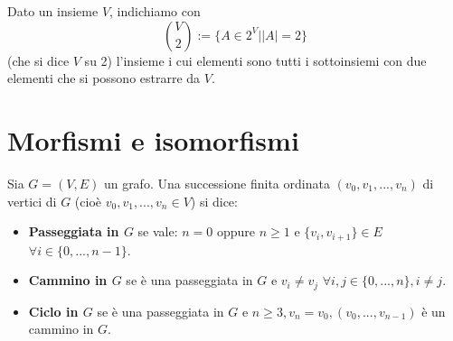 \documentclass[oneside]{book}
\begin{document}
\begin{tcolorbox}[colback=yellow!30, colframe=yellow!30!black, title=Insieme dei 2-sottoinsiemi]
Dato un insieme $V$, indichiamo con
\[ \binom{V}{2}:=\{ A \in 2^V| \left|A\right|=2 \} \]
(che si dice $V$ su 2) l'insieme i cui elementi sono tutti
i sottoinsiemi con due elementi che si possono estrarre da $V$.
\end{tcolorbox}



\section{Morfismi e isomorfismi}



\begin{tcolorbox}[colback=yellow!30, colframe=yellow!30!black, title={Passeggiate, cammini, cicli}]
Sia $G=(V,E)$ un grafo. Una successione finita ordinata $(v_0,v_1,...,v_n)$
di vertici di $G$ (cioè $v_0,v_1,...,v_n \in V$) si dice:
\begin{itemize}
\item \textbf{Passeggiata in $G$} se vale: $n=0$ oppure $n\geq 1$ e $\{v_i,v_{i+1}\}\in E$ $\forall i \in \{0,...,n-1\}$.
\item \textbf{Cammino in $G$} se è una passeggiata in $G$ e $v_i \not = v_j$ $\forall i,j \in \{0,...,n\}, i\not = j$.
\item \textbf{Ciclo in $G$} se è una passeggiata in $G$ e $n \geq 3, v_n=v_0, (v_0,...,v_{n-1})$ è un cammino in $G$.
\end{itemize}
\end{tcolorbox}
\end{document}
